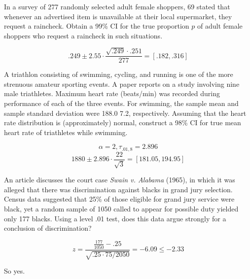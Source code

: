 \begin{questions}

    \question[3] In a survey of 277 randomly selected adult female
    shoppers, 69 stated that whenever an advertised item is
    unavailable at their local supermarket, they request a
    raincheck. Obtain a 99\% CI for the true proportion $p$ of adult
    female shoppers who request a raincheck in such situations.

    \begin{solution}
    
        $$.249 \pm 2.55 \cdot \frac{\sqrt{.249} \cdot .251}{277} =
        [.182, .316]$$

    \end{solution}


    \question[2] A triathlon consisting of swimming, cycling, and
    running is one of the more strenuous amateur sporting events. A
    paper reports on a study involving nine male triathletes. Maximum
    heart rate (beats/min) was recorded during performance of each of
    the three events. For swimming, the sample mean and sample
    standard deviation were 188.0 7.2, respectively. Assuming that the
    heart rate distribution is (approximately) normal, construct a
    98\% CI for true mean heart rate of triathletes while swimming.

    \begin{solution}

        $$\alpha = 2, \tau_{.01, 8} = 2.896$$
        $$1880 \pm 2.896 \cdot \frac{22}{\sqrt{3}} = [181.05,
        194.95]$$

    \end{solution}


    \question[2] An article discusses the court case {\it Swain
    v. Alabama} (1965), in which it was alleged that there was
    discrimination against blacks in grand jury selection. Census data
    suggested that 25\% of those eligible for grand jury service were
    black, yet a random sample of 1050 called to appear for possible
    duty yielded only 177 blacks. Using a level .01 test, does this
    data argue strongly for a conclusion of discrimination?

    \begin{solution}

        $$z = \frac{\frac{177}{1050} - .25}{\sqrt{.25 \cdot 75/2050}}
        = -6.09 \le -2.33$$

        So yes.


\end{solution}
\end{questions}
